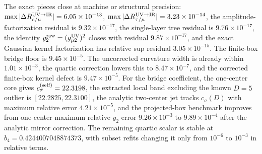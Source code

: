 \documentclass[aps,prd,onecolumn,notitlepage,nofootinbib,superscriptaddress,11pt,floatfix]{revtex4-2}
\begin{document}
The exact pieces close at machine or structural precision: \(\max|\Delta R_{e/\mu}^{\rm UV\to IR}|=6.05\times10^{-13}\), \(\max|\Delta R_{\tau/\mu}^{\rm UV\to IR}|=3.23\times10^{-14}\), the amplitude-factorization residual is \(9.32\times10^{-17}\), the single-layer tree residual is \(9.76\times10^{-17}\), the identity \(y_2^{\rm raw}=(g_{\mu2}^{\rm UV})^2\) closes with residual \(9.87\times10^{-17}\), and the exact Gaussian kernel factorization has relative sup residual \(3.05\times10^{-15}\).  The finite-box bridge floor is \(9.45\times10^{-5}\).  The uncorrected curvature width is already within \(1.01\times10^{-3}\), the quartic correction lowers this to \(8.47\times10^{-7}\), and the corrected finite-box kernel defect is \(9.47\times10^{-5}\).  For the bridge coefficient, the one-center core gives \(c_\sigma^{\rm(self)}=22.3198\), the extracted local band excluding the known \(D=5\) outlier is \([22.2825,22.3100]\), the analytic two-center jet tracks \(c_\sigma(D)\) with maximum relative error \(4.21\times10^{-5}\), and the projected-box benchmark improves from one-center maximum relative \(y_2\) error \(9.26\times10^{-3}\) to \(9.89\times10^{-4}\) after the analytic mirror correction.  The remaining quartic scalar is stable at \(b_4=0.4244007048874373\), with subset refits changing it only from \(10^{-6}\) to \(10^{-3}\) in relative terms.
\end{document}
